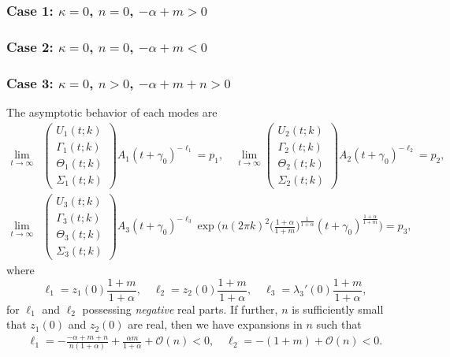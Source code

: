 \documentclass[a4paper,11pt]{article}
\theoremstyle{remark}
\begin{document}
\subsubsection{Case 1: $\kappa=0$, $n=0$, $-\alpha+m>0$}
\subsubsection{Case 2: $\kappa=0$, $n=0$, $-\alpha+m<0$}
\subsubsection{Case 3: $\kappa=0$, $n>0$, $-\alpha +m +n>0$}
The asymptotic behavior of each modes are
\begin{align*}
\lim_{t \rightarrow \infty}
&\begin{pmatrix}
  U_1(t;k)\\ \Gamma_1(t;k) \\ \Theta_1(t;k) \\ \Sigma_1(t;k)
 \end{pmatrix} A_1(t+\gamma_0)^{-\ell_1} = p_1, \quad
\lim_{t \rightarrow \infty}
\begin{pmatrix}
  U_2(t;k)\\ \Gamma_2(t;k) \\ \Theta_2(t;k) \\ \Sigma_2(t;k)
 \end{pmatrix} A_2(t+\gamma_0)^{-\ell_2} = p_2, \\
\lim_{t \rightarrow \infty}
&\begin{pmatrix}
  U_3(t;k)\\ \Gamma_3(t;k) \\ \Theta_3(t;k) \\ \Sigma_3(t;k)
 \end{pmatrix} A_3(t+\gamma_0)^{-\ell_3}\exp\big(n(2\pi k)^2 \big(\frac{1+\alpha}{1+m}\big)^{\frac{1}{1+\alpha}}(t+\gamma_0)^{\frac{1+\alpha}{1+m}}\big) = p_3,
\end{align*}
where
$$\ell_1 = z_1(0)\frac{1+m}{1+\alpha}, \quad \ell_2 = z_2(0)\frac{1+m}{1+\alpha}, \quad\ell_3 = \lambda_3'(0)\frac{1+m}{1+\alpha},$$
for $\ell_1$ and $\ell_2$ possessing \emph{negative} real parts.
If further, $n$ is sufficiently small that $z_1(0)$ and $z_2(0)$ are real, then we have expansions in $n$ such that
\begin{align*}
 \ell_1 = -\frac{-\alpha+m+n}{n(1+\alpha)} + \frac{\alpha m}{1+\alpha} + \mathcal{O}(n)<0, \quad
 \ell_2 = -(1+m)  + \mathcal{O}(n)<0.
\end{align*}
\end{document}
